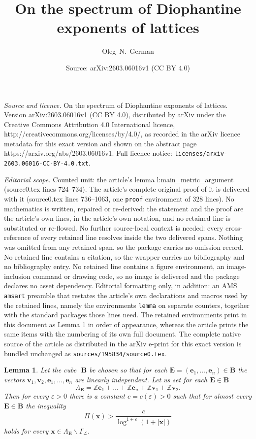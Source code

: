 \documentclass[10pt,a4paper]{amsart}
\title{On the spectrum of Diophantine exponents of lattices}
\author{Oleg\, N.\, German}
\date{Source: arXiv:2603.06016v1 (CC BY 4.0)}
\newtheorem{lemma}{Lemma}
\newcommand{\Ga}{\Gamma}
\newcommand{\La}{\Lambda}
\newcommand{\Z}{\mathbb{Z}}
\newcommand{\bB}{\mathbf{B}}
\newcommand{\bE}{\mathbf{E}}
\newcommand{\cL}{\mathcal{L}}
\newcommand{\e}{\varepsilon}
\renewcommand{\vec}[1]{\mathbf{#1}}
\begin{document}
\maketitle

\noindent\emph{Source and licence.} On the spectrum of Diophantine exponents of lattices. Version arXiv:2603.06016v1 (CC BY 4.0), distributed by arXiv under the Creative Commons Attribution 4.0 International licence, http://creativecommons.org/licenses/by/4.0/, as recorded in the arXiv licence metadata for this exact version and shown on the abstract page https://arxiv.org/abs/2603.06016v1. Full licence notice: \texttt{licenses/arxiv-2603.06016-CC-BY-4.0.txt}.\par\smallskip

\noindent\textit{Editorial scope.} Counted unit: the article's lemma l:main\_metric\_argument (source0.tex lines 724--734). The article's complete original proof of it is delivered with it (source0.tex lines 736--1063, one \texttt{proof} environment of 328 lines). No mathematics is written, repaired or re-derived: the statement and the proof are the article's own lines, in the article's own notation, and no retained line is substituted or re-flowed.  No further source-local context is needed: every cross-reference of every retained line resolves inside the two delivered spans.  Nothing was omitted from any retained span, so the package carries no omission record.  No retained line contains a citation, so the wrapper carries no bibliography and no bibliography entry.  No retained line contains a figure environment, an image-inclusion command or drawing code, so no image is delivered and the package declares no asset dependency.  Editorial formatting only, in addition: an AMS \texttt{amsart} preamble that restates the article's own declarations and macros used by the retained lines, namely the environments \texttt{lemma} on separate counters, together with the standard packages those lines need.  The retained environments print in this document as Lemma 1 in order of appearance, whereas the article prints the same items with the numbering of its own full document.  The complete native source of the article as distributed in the arXiv e-print for this exact version is bundled unchanged as \texttt{sources/195834/source0.tex}.
\begin{lemma}\label{l:main_metric_argument}
  Let the cube\,\ $\bB$ be chosen so that for each $\bE=(\vec e_1,\ldots,\vec e_n)\in\bB$ the vectors $\vec v_1,\vec v_2,\vec e_1,\ldots,\vec e_n$ are linearly independent. Let us set for each $\bE\in\bB$
  \[
    \La_\bE=\Z\vec e_1+\ldots+\Z\vec e_n+\Z\vec v_1+\Z\vec v_2.
  \]
  Then for every $\e>0$ there is a constant $c=c(\e)>0$ such that for almost every $\bE\in\bB$ the inequality
  \[
    \Pi(\vec x)>\frac c{\log^{1+\e}(1+|\vec x|)}
  \]
  holds for every $\vec x\in\La_\bE\backslash\Ga_\cL$.
\end{lemma}
\end{document}

